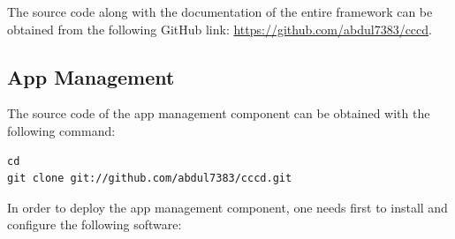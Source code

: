 The source code along with the documentation of the entire framework can be obtained from the following GitHub link: \url{https://github.com/abdul7383/cccd}.

\subsection{App Management\label{sec:eval_te_en_app}}
The source code of the app management component can be obtained with the following command:
\begin{code}
\begin{verbatim}
cd
git clone git://github.com/abdul7383/cccd.git
\end{verbatim}
\end{code}

In order to deploy the app management component, one needs first to install and configure the following software:

